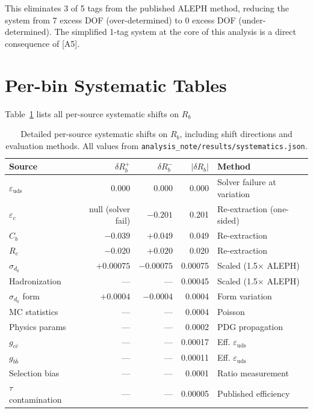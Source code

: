 \documentclass[11pt,a4paper]{article}
\begin{document}
This eliminates 3 of 5 tags from the published ALEPH method, reducing the system from
7 excess DOF (over-determined) to 0 excess DOF (under-determined). The simplified
1-tag system at the core of this analysis is a direct consequence of [A5].

\clearpage


\clearpage
\appendix

\section{Per-bin Systematic Tables}
\label{app:syst-tables}

Table~\ref{tab:syst_perbin_rb} lists all per-source systematic shifts on $R_b$

\begin{table}[htbp]
\centering
\caption{Detailed per-source systematic shifts on $R_b$, including shift directions
and evaluation methods. All values from \texttt{analysis\_note/results/systematics.json}.}
\label{tab:syst_perbin_rb}
\small
\begin{tabular}{lrrrl}
\toprule
Source & $\delta R_b^{+}$ & $\delta R_b^{-}$ & $|\delta R_b|$ & Method \\
\midrule
$\varepsilon_\mathrm{uds}$ & $0.000$ & $0.000$ & 0.000 & Solver failure at variation \\
$\varepsilon_c$ & null (solver fail) & $-0.201$ & 0.201 & Re-extraction (one-sided) \\
$C_b$ & $-0.039$ & $+0.049$ & 0.049 & Re-extraction \\
$R_c$ & $-0.020$ & $+0.020$ & 0.020 & Re-extraction \\
$\sigma_{d_0}$ & $+0.00075$ & $-0.00075$ & 0.00075 & Scaled (1.5$\times$ ALEPH) \\
Hadronization & --- & --- & 0.00045 & Scaled (1.5$\times$ ALEPH) \\
$\sigma_{d_0}$ form & $+0.0004$ & $-0.0004$ & 0.0004 & Form variation \\
MC statistics & --- & --- & 0.0004 & Poisson \\
Physics params & --- & --- & 0.0002 & PDG propagation \\
$g_{c\bar{c}}$ & --- & --- & 0.00017 & Eff. $\varepsilon_\mathrm{uds}$ \\
$g_{b\bar{b}}$ & --- & --- & 0.00011 & Eff. $\varepsilon_\mathrm{uds}$ \\
Selection bias & --- & --- & 0.0001 & Ratio measurement \\
$\tau$ contamination & --- & --- & 0.00005 & Published efficiency \\
\bottomrule
\end{tabular}
\end{table}
\end{document}
